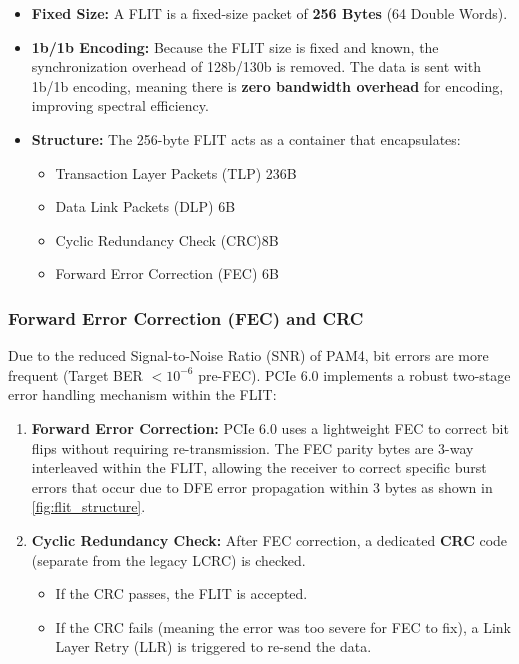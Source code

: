 \begin{itemize}
    \item \textbf{Fixed Size:} A FLIT is a fixed-size packet of \textbf{256 Bytes} (64 Double Words).
    \item \textbf{1b/1b Encoding:} Because the FLIT size is fixed and known, the synchronization overhead of 128b/130b is removed. The data is sent with 1b/1b encoding, meaning there is \textbf{zero bandwidth overhead} for encoding, improving spectral efficiency.
    \item \textbf{Structure:} The 256-byte FLIT acts as a container that encapsulates:
    \begin{itemize}
        \item Transaction Layer Packets (TLP) 236B
        \item Data Link Packets (DLP) 6B
        \item Cyclic Redundancy Check (CRC)8B
        \item Forward Error Correction (FEC) 6B
    \end{itemize}
\end{itemize}

\subsubsection*{Forward Error Correction (FEC) and CRC}
Due to the reduced Signal-to-Noise Ratio (SNR) of PAM4, bit errors are more frequent (Target BER $< 10^{-6}$ pre-FEC). PCIe 6.0 implements a robust two-stage error handling mechanism within the FLIT:

\begin{enumerate}
    \item \textbf{Forward Error Correction:} PCIe 6.0 uses a lightweight FEC to correct bit flips without requiring re-transmission. The FEC parity bytes are 3-way interleaved within the FLIT, allowing the receiver to correct specific burst errors that occur due to DFE error propagation within 3 bytes as shown in \ref{fig:flit_structure}.
    
    \item \textbf{Cyclic Redundancy Check:}
    After FEC correction, a dedicated \textbf{CRC} code (separate from the legacy LCRC) is checked.
    \begin{itemize}
        \item If the CRC passes, the FLIT is accepted.
        \item If the CRC fails (meaning the error was too severe for FEC to fix), a Link Layer Retry (LLR) is triggered to re-send the data.
    \end{itemize}
\end{enumerate}

